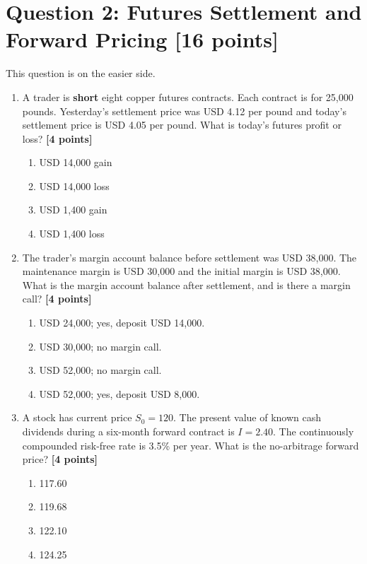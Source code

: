 \documentclass[11pt]{article}
\newcommand{\pts}[1]{\hspace{0.35em}\textnormal{\textbf{[#1 points]}}}
\newenvironment{choices}{\begin{enumerate}[label=\Alph*.,leftmargin=2.2em,itemsep=0.12em,topsep=0.12em]}{\end{enumerate}}
\begin{document}
\section*{Question 2: Futures Settlement and Forward Pricing \pts{16}}

This question is on the easier side.

\begin{enumerate}
    \item A trader is \textbf{short} eight copper futures contracts. Each
    contract is for 25,000 pounds. Yesterday's settlement price was USD 4.12 per
    pound and today's settlement price is USD 4.05 per pound. What is today's
    futures profit or loss? \pts{4}
    \begin{choices}
        \item USD 14,000 gain
        \item USD 14,000 loss
        \item USD 1,400 gain
        \item USD 1,400 loss
    \end{choices}

    \item The trader's margin account balance before settlement was USD 38,000.
    The maintenance margin is USD 30,000 and the initial margin is USD 38,000.
    What is the margin account balance after settlement, and is there a margin
    call? \pts{4}
    \begin{choices}
        \item USD 24,000; yes, deposit USD 14,000.
        \item USD 30,000; no margin call.
        \item USD 52,000; no margin call.
        \item USD 52,000; yes, deposit USD 8,000.
    \end{choices}

    \item A stock has current price $S_0=120$. The present value of known cash
    dividends during a six-month forward contract is $I=2.40$. The continuously
    compounded risk-free rate is 3.5\% per year. What is the no-arbitrage
    forward price? \pts{4}
    \begin{choices}
        \item 117.60
        \item 119.68
        \item 122.10
        \item 124.25
    \end{choices}


\end{enumerate}
\end{document}
